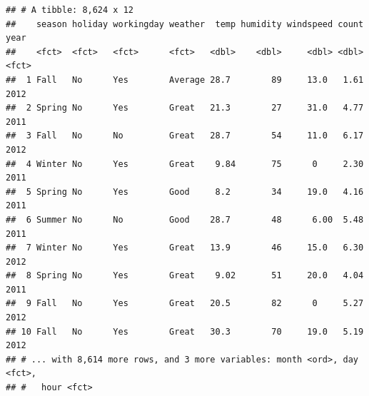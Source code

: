 \documentclass[american,]{article}
\newenvironment{Shaded}{\begin{snugshade}}{\end{snugshade}}
\newcommand{\CommentTok}[1]{\textcolor[rgb]{0.56,0.35,0.01}{\textit{#1}}}
\newcommand{\DataTypeTok}[1]{\textcolor[rgb]{0.13,0.29,0.53}{#1}}
\newcommand{\DecValTok}[1]{\textcolor[rgb]{0.00,0.00,0.81}{#1}}
\newcommand{\FloatTok}[1]{\textcolor[rgb]{0.00,0.00,0.81}{#1}}
\newcommand{\KeywordTok}[1]{\textcolor[rgb]{0.13,0.29,0.53}{\textbf{#1}}}
\newcommand{\NormalTok}[1]{#1}
\newcommand{\OperatorTok}[1]{\textcolor[rgb]{0.81,0.36,0.00}{\textbf{#1}}}
\newcommand{\StringTok}[1]{\textcolor[rgb]{0.31,0.60,0.02}{#1}}
\begin{document}
\begin{verbatim}
## # A tibble: 8,624 x 12
##    season holiday workingday weather  temp humidity windspeed count year 
##    <fct>  <fct>   <fct>      <fct>   <dbl>    <dbl>     <dbl> <dbl> <fct>
##  1 Fall   No      Yes        Average 28.7        89     13.0   1.61 2012 
##  2 Spring No      Yes        Great   21.3        27     31.0   4.77 2011 
##  3 Fall   No      No         Great   28.7        54     11.0   6.17 2012 
##  4 Winter No      Yes        Great    9.84       75      0     2.30 2011 
##  5 Spring No      Yes        Good     8.2        34     19.0   4.16 2011 
##  6 Summer No      No         Good    28.7        48      6.00  5.48 2011 
##  7 Winter No      Yes        Great   13.9        46     15.0   6.30 2012 
##  8 Spring No      Yes        Great    9.02       51     20.0   4.04 2011 
##  9 Fall   No      Yes        Great   20.5        82      0     5.27 2012 
## 10 Fall   No      Yes        Great   30.3        70     19.0   5.19 2012 
## # ... with 8,614 more rows, and 3 more variables: month <ord>, day <fct>,
## #   hour <fct>
\end{verbatim}

\begin{Shaded}
\end{Shaded}
\end{document}
